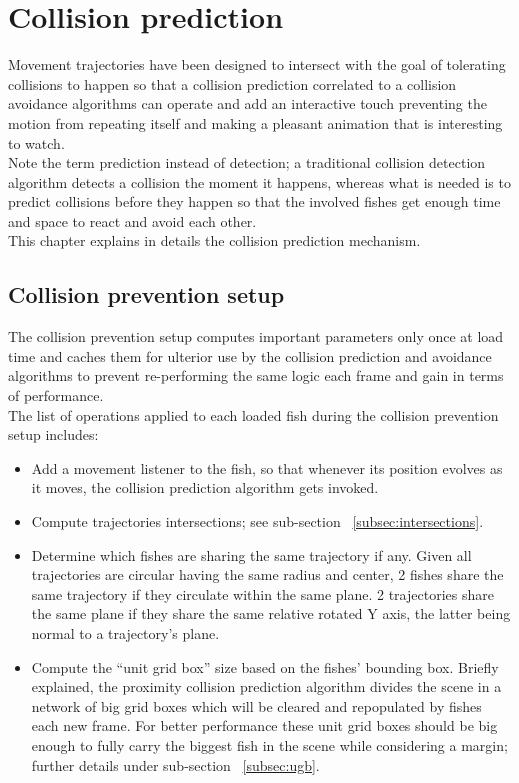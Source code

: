 \chapter{Collision prediction}
Movement trajectories have been designed to intersect with the goal of tolerating collisions to happen so that a collision prediction correlated to a collision avoidance algorithms can operate and add an interactive touch preventing the motion from repeating itself and making a pleasant animation that is interesting to watch.\\

Note the term prediction instead of detection; a traditional collision detection algorithm detects a collision the moment it happens, whereas what is needed is to predict collisions before they happen so that the involved fishes get enough time and space to react and avoid each other.\\

This chapter explains in details the collision prediction mechanism.

\section{Collision prevention setup}
\label{sec:setup}
The collision prevention setup computes important parameters only once at load time and caches them for ulterior use by the collision prediction and avoidance algorithms to prevent re-performing the same logic each frame and gain in terms of performance.\\

The list of operations applied to each loaded fish during the collision prevention setup includes:

\begin{itemize}

\item Add a movement listener to the fish, so that whenever its position evolves as it moves, the collision prediction algorithm gets invoked.

\item Compute trajectories intersections; see sub-section ~\ref{subsec:intersections}.

\item Determine which fishes are sharing the same trajectory if any. Given all trajectories are circular having the same radius and center, 2 fishes share the same trajectory if they circulate within the same plane. 2 trajectories share the same plane if they share the same relative rotated Y axis, the latter being normal to a trajectory's plane.

\item Compute the ``unit grid box'' size based on the fishes' bounding box. Briefly explained, the proximity collision prediction algorithm divides the scene in a network of big grid boxes which will be cleared and repopulated by fishes each new frame. For better performance these unit grid boxes should be big enough to fully carry the biggest fish in the scene while considering a margin; further details under sub-section ~\ref{subsec:ugb}.

\end{itemize}

